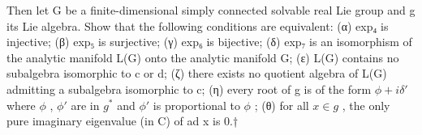 Then let G be a finite-dimensional simply connected solvable real Lie group and g its Lie algebra. Show that the following conditions are equivalent: (α) exp₄ is injective; (β) exp₅ is surjective; (γ) exp₆ is bijective; (δ) exp₇ is an isomorphism of the analytic manifold L(G) onto the analytic manifold G; (ε) L(G) contains no subalgebra isomorphic to c or d; (ζ) there exists no quotient algebra of L(G) admitting a subalgebra isomorphic to c; (η) every root of g is of the form \(\phi + i\delta'\) where \(\phi\) , \(\phi'\) are in \(g^*\) and \(\phi'\) is proportional to \(\phi\) ; (θ) for all \(x \in g\) , the only pure imaginary eigenvalue (in C) of ad x is 0.†
